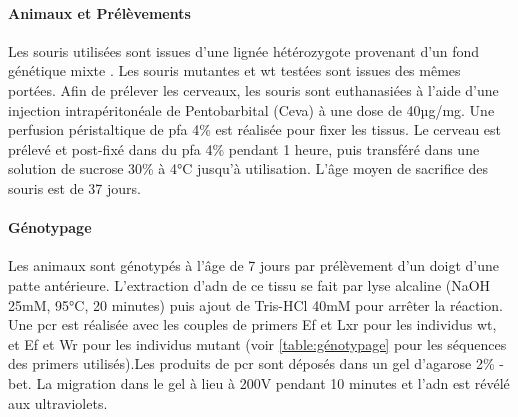 \paragraph{Animaux et Prélèvements}
\label{par:AnimEtPrelev}
	Les souris utilisées sont issues d'une lignée hétérozygote provenant d'un fond génétique mixte \cite{Messeant2015, Messeant2017}. Les souris mutantes \mcrd et \gls{wt} testées sont issues des mêmes portées. Afin de prélever les cerveaux, les souris sont  euthanasiées à l'aide d'une injection intrapéritonéale de Pentobarbital (Ceva\textregistered) à une dose de 40µg/mg. Une perfusion péristaltique de \gls{pfa} 4\% est réalisée pour fixer les tissus. Le cerveau est prélevé et post-fixé dans du \gls{pfa} 4\% pendant 1 heure, puis transféré dans une solution de sucrose 30\% à 4°C jusqu'à utilisation. L'âge moyen de sacrifice des souris est de 37 jours.
	
\paragraph{Génotypage}
\label{par:genotypage}
	Les animaux sont génotypés à l'âge de 7 jours par prélèvement d'un doigt d'une patte antérieure. L'extraction d'\acrshort{adn} de ce tissu se fait par lyse alcaline (NaOH 25mM, 95°C, 20 minutes) puis ajout de Tris-HCl 40mM pour arrêter la réaction. Une \acrshort{pcr} est réalisée avec les couples de primers Ef et Lxr  pour les individus \gls{wt}, et Ef et Wr pour les individus mutant (voir \cref{table:génotypage} pour les séquences des primers utilisés).Les produits de \acrshort{pcr} sont déposés dans un gel d'agarose 2\% - \acrshort{bet}. La migration dans le gel à lieu à 200V pendant 10 minutes et l'\acrshort{adn} est révélé aux ultraviolets.
	
	\begin{table}[h]
	\end{table}
\FloatBarrier
	
